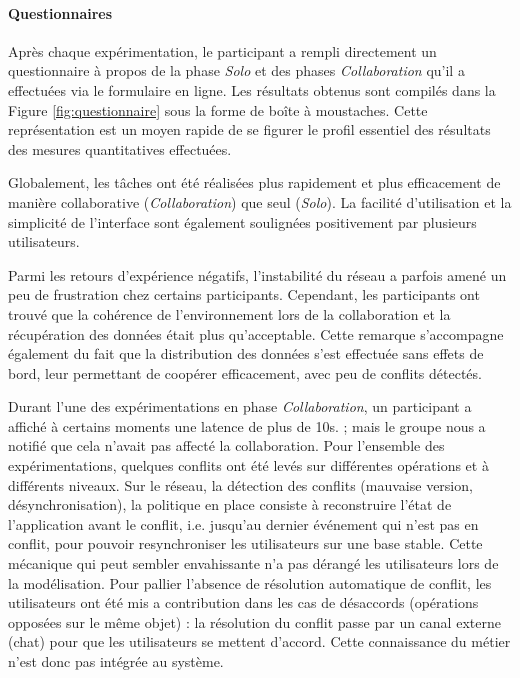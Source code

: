 \paragraph{Questionnaires}
Après chaque expérimentation, le participant a rempli directement un questionnaire 
à propos de la phase \textit{Solo} et des phases \textit{Collaboration} qu'il a 
effectuées via le formulaire en ligne. Les résultats obtenus sont compilés dans la 
Figure \ref{fig:questionnaire} sous la forme de boîte à moustaches. Cette 
représentation est un moyen rapide de se figurer le profil essentiel des résultats 
des mesures quantitatives effectuées.

Globalement, les tâches ont été réalisées plus rapidement et plus efficacement 
de manière collaborative (\textit{Collaboration}) que seul (\textit{Solo}). La facilité 
d'utilisation et la simplicité de l'interface sont également soulignées positivement 
par plusieurs utilisateurs. 

Parmi les retours d'expérience négatifs, l'instabilité du réseau a parfois amené un 
peu de frustration chez certains participants. 
Cependant, les participants ont trouvé que la cohérence de l'environnement lors de 
la collaboration et la récupération des données était plus qu'acceptable. Cette 
remarque s'accompagne également du fait que la distribution des données s'est 
effectuée sans effets de bord, leur permettant de coopérer efficacement, avec peu 
de conflits détectés.

Durant l'une des expérimentations en phase \textit{Collaboration}, un 
participant a affiché à certains moments une latence de plus de 10s. ; mais 
le groupe nous a notifié que cela n'avait pas affecté la collaboration. Pour 
l'ensemble des expérimentations, quelques conflits ont été levés sur différentes 
opérations et à différents niveaux. 
Sur le réseau, la détection des conflits (mauvaise version, désynchronisation), la 
politique en place consiste à reconstruire l'état de l'application avant le conflit, i.e. 
jusqu'au dernier événement qui n'est pas en conflit, pour pouvoir resynchroniser 
les utilisateurs sur une base stable. Cette mécanique qui peut sembler 
envahissante n'a pas dérangé les utilisateurs lors de la modélisation.
Pour pallier l'absence de résolution automatique de conflit, les utilisateurs ont été 
mis a contribution dans les cas de désaccords (opérations opposées sur le même 
objet) : la résolution du conflit passe par un canal externe (chat) pour que les 
utilisateurs se mettent d'accord. Cette connaissance du métier n'est donc pas 
intégrée au système.


